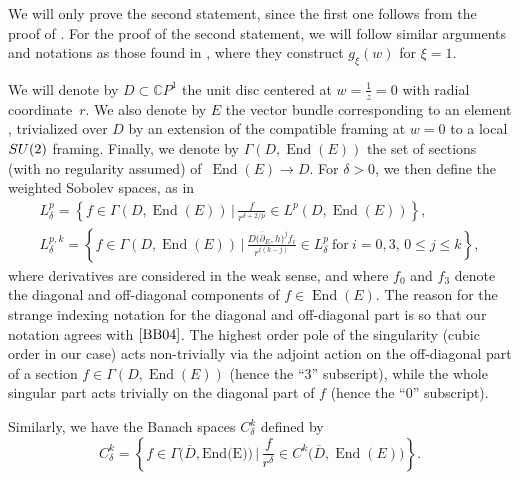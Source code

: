 \documentclass[11pt]{article}
\numberwithin{equation}{section}
\numberwithin{equation}{section}
\newcommand{\CP}{\mathbb{C}P^1}
\begin{document}
We will only prove the second statement, since the first one follows from the proof of \cite[Theorem 7]{B2}. For the proof of the second statement, we will follow similar arguments and notations as those found in \cite{BB04}, where they construct $g_{\xi}(w)$ for $\xi=1$.

We will denote by $D \subset \CP$ the unit disc centered at $w=\frac{1}{z}=0$ with radial coordinate~$r$. We also denote by $E$ the vector bundle corresponding to an element , trivialized over $D$ by an extension of the compatible framing at $w=0$ to a local ${\rm SU}(2)$ framing. Finally, we denote by $\Gamma(D,\operatorname{End}(E))$ the set of sections (with no regularity assumed) of~${\operatorname{End}(E)\to D}$. For $\delta >0$, we then define the weighted Sobolev spaces, as in \cite{BB04}
\begin{gather*}
 L_{\delta}^p=\left\{ f\in \Gamma(D,\operatorname{End}(E)) \,\Big|\, \frac{f}{r^{\delta +2/p}} \in L^p(D,\operatorname{End}(E))\right\},\\
 L_{\delta}^{p,k}=\left\{ f\in \Gamma(D,\operatorname{End}(E)) \,\Big|\, \frac{D\bigl(\overline{\partial}_E,h\bigr)^{j}f_i}{r^{i(k-j)}} \in L^p_{\delta} \ \text{for}\ i=0,3,\, 0\leq j \leq k\right\},
\end{gather*}
where derivatives are considered in the weak sense, and where $f_0$ and $f_3$ denote the diagonal and off-diagonal components of $f\in \operatorname{End}(E)$. The reason for the strange indexing notation for the diagonal and off-diagonal part is so that our notation agrees with $\cite{BB04}$. The highest order pole of the singularity (cubic order in our case) acts non-trivially via the adjoint action on the off-diagonal part of a section $f\in \Gamma(D,\operatorname{End}(E))$ (hence the ``$3$'' subscript), while the whole singular part acts trivially on the diagonal part of $f$ (hence the ``$0$'' subscript).

Similarly, we have the Banach spaces $C^k_{\delta}$ defined by
\begin{equation*}
 C^k_{\delta}=\left\{ f \in \Gamma\bigl(\overline{D},\text{End(E)}\bigr) \,\Big|\, \frac{f}{r^{\delta}} \in C^k\bigl(\overline{D},\operatorname{End}(E)\bigr)\right\}.
\end{equation*}
\end{document}
